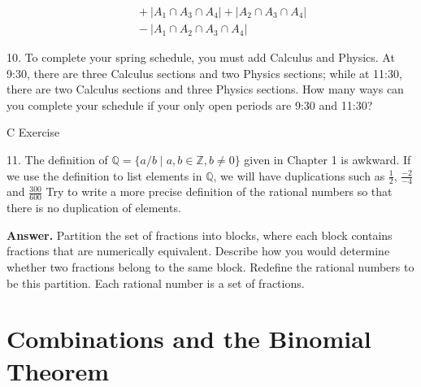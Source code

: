 \documentclass[10pt,]{book}
\theoremstyle{plain}
\theoremstyle{definition}
\theoremstyle{definition}
\theoremstyle{definition}
\begin{document}
\begin{exercisegroup}
\begin{equation*}
\begin{split}
   & \quad  +\lvert A_1\cap A_3\cap A_4\rvert  +\lvert A_2\cap A_3\cap A_4\rvert \\
   & \quad     -\lvert A_1\cap A_2 \cap A_3\cap A_4\rvert 
\end{split}   
\end{equation*}
%
\item[10.]\hypertarget{exercise-41}{} To complete your spring schedule, you must add Calculus and Physics. At 9:30, there are three Calculus sections and two Physics sections; while at 11:30, there are two Calculus sections and three Physics sections.  How many ways can you complete your schedule if your only open periods are 9:30 and 11:30?%
\par\smallskip
\end{exercisegroup}
\par\smallskip\noindent
\hypertarget{exercisegroup-7}{}\typeout{************************************************}
\typeout{************************************************}
C Exercise%
\begin{exercisegroup}
\item[11.]\hypertarget{exercise-42}{}The definition of \(\mathbb{Q}  = \{a/b \mid a, b \in \mathbb{Z}, b \neq 0\}\) given in Chapter 1 is  awkward. If we use the definition to list elements in \(\mathbb{Q}\), we will have duplications such as \(\frac{1}{2}\), \(\frac{-2}{-4}\) and \(\frac{300}{600}\)   Try to write a more precise definition of the rational numbers so that there is no duplication of elements.%
\par\smallskip
\par\smallskip
\noindent\textbf{Answer.}\hypertarget{answer-21}{}\quad
Partition the set of fractions into blocks, where each block contains fractions that are numerically equivalent. Describe how you would determine whether two fractions belong to the same block. Redefine the rational numbers to be this partition. Each rational number is a set of fractions.%
\end{exercisegroup}
\par\smallskip\noindent
\typeout{************************************************}
\typeout{************************************************}
\section[Combinations and the Binomial Theorem]{Combinations and the Binomial Theorem}\label{combinations-and-the-binomial-theorem}
\typeout{************************************************}
\typeout{************************************************}
\end{document}
